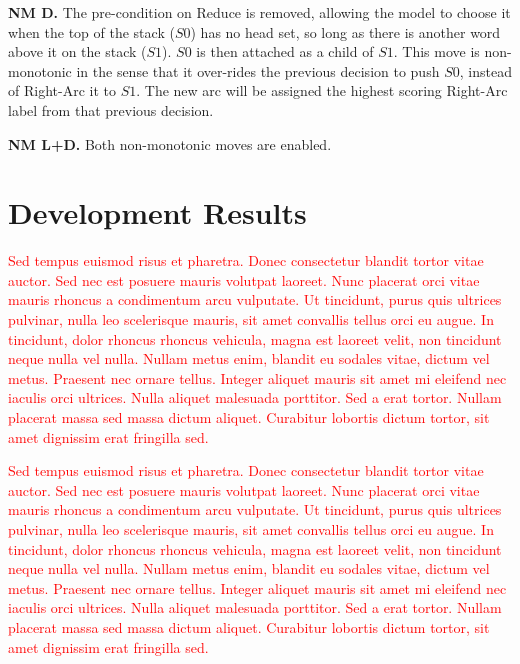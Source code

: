 \documentclass[11pt,letterpaper]{article}
\newcommand{\note}[1]{\textcolor{red}{#1}}
\begin{document}
\textbf{NM D.} The pre-condition on Reduce is removed, allowing the model to choose it
when the top of the stack ($S0$) has no head set, so long as there is another word
above it on the stack ($S1$). $S0$ is then attached as a child of $S1$. This move
is non-monotonic in the sense that it over-rides the previous decision to push $S0$,
instead of Right-Arc it to $S1$. The new arc will be assigned the highest scoring
Right-Arc label from that previous decision.

\textbf{NM L+D.} Both non-monotonic moves are enabled. 

\section{Development Results}
\label{sec:results}
\note{
Sed tempus euismod risus et pharetra. Donec consectetur blandit tortor vitae auctor. Sed nec est posuere mauris volutpat laoreet. Nunc placerat orci vitae mauris rhoncus a condimentum arcu vulputate. Ut tincidunt, purus quis ultrices pulvinar, nulla leo scelerisque mauris, sit amet convallis tellus orci eu augue. In tincidunt, dolor rhoncus rhoncus vehicula, magna est laoreet velit, non tincidunt neque nulla vel nulla. Nullam metus enim, blandit eu sodales vitae, dictum vel metus. Praesent nec ornare tellus. Integer aliquet mauris sit amet mi eleifend nec iaculis orci ultrices. Nulla aliquet malesuada porttitor. Sed a erat tortor. Nullam placerat massa sed massa dictum aliquet. Curabitur lobortis dictum tortor, sit amet dignissim erat fringilla sed.}

\note{Sed tempus euismod risus et pharetra. Donec consectetur blandit tortor vitae auctor. Sed nec est posuere mauris volutpat laoreet. Nunc placerat orci vitae mauris rhoncus a condimentum arcu vulputate. Ut tincidunt, purus quis ultrices pulvinar, nulla leo scelerisque mauris, sit amet convallis tellus orci eu augue. In tincidunt, dolor rhoncus rhoncus vehicula, magna est laoreet velit, non tincidunt neque nulla vel nulla. Nullam metus enim, blandit eu sodales vitae, dictum vel metus. Praesent nec ornare tellus. Integer aliquet mauris sit amet mi eleifend nec iaculis orci ultrices. Nulla aliquet malesuada porttitor. Sed a erat tortor. Nullam placerat massa sed massa dictum aliquet. Curabitur lobortis dictum tortor, sit amet dignissim erat fringilla sed.
}
\end{document}
